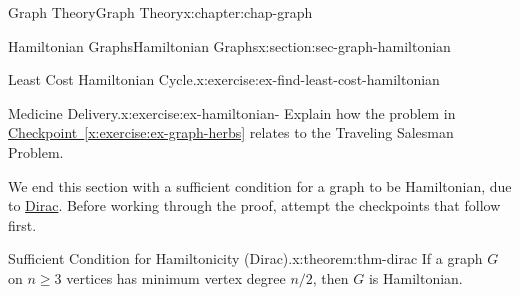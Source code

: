 \documentclass[oneside,10pt,]{book}
\newcommand{\xreffont}{\relax}
\numberwithin{equation}{section}
\begin{document}
\begin{chapterptx}{Graph Theory}{}{Graph Theory}{}{}{x:chapter:chap-graph}
\begin{sectionptx}{Hamiltonian Graphs}{}{Hamiltonian Graphs}{}{}{x:section:sec-graph-hamiltonian}
\begin{inlineexercise}{Least Cost Hamiltonian Cycle.}{x:exercise:ex-find-least-cost-hamiltonian}
\begin{sidebyside}{1}{0.35}{0.35}{0}
\begin{sbspanel}{0.3}
{
}%
\end{sbspanel}%
\end{sidebyside}%
\end{inlineexercise}
\begin{inlineexercise}{Medicine Delivery.}{x:exercise:ex-hamiltonian-}%
Explain how the problem in \hyperref[x:exercise:ex-graph-herbs]{Checkpoint~{\xreffont\ref{x:exercise:ex-graph-herbs}}} relates to the Traveling Salesman Problem.%
\end{inlineexercise}
We end this section with a sufficient condition for a graph to be Hamiltonian, due to \href{https://en.wikipedia.org/wiki/Gabriel_Andrew_Dirac}{Dirac}. Before working through the proof, attempt the checkpoints that follow first.%
\begin{theorem}{Sufficient Condition for Hamiltonicity (Dirac).}{}{x:theorem:thm-dirac}%
If a graph \(G\) on \(n \geq 3\) vertices has minimum vertex degree \(n/2\), then \(G\) is Hamiltonian.%

\end{theorem}
\end{sectionptx}
\end{chapterptx}
\end{document}
